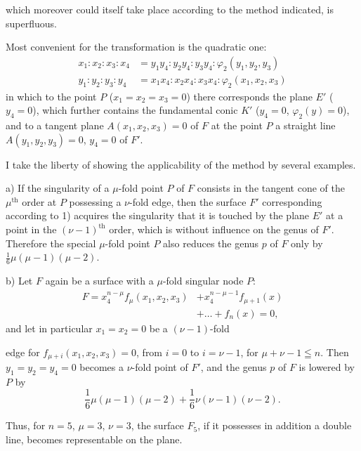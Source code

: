 \documentclass{article}
\begin{document}
which moreover could itself take place according to the method indicated, is superfluous.

Most convenient for the transformation is the quadratic one:
\[
\begin{aligned}
x_1 : x_2 : x_3 : x_4 &= y_1 y_4 : y_2 y_4 : y_3 y_4 : \varphi_2(y_1, y_2, y_3) \\
y_1 : y_2 : y_3 : y_4 &= x_1 x_4 : x_2 x_4 : x_3 x_4 : \varphi_2(x_1, x_2, x_3)
\end{aligned}
\tag{1}
\]
in which to the point $P$ ($x_1 = x_2 = x_3 = 0$) there corresponds the plane $E'$ ($y_4 = 0$), which further contains the fundamental conic $K'$ ($y_4 = 0$, $\varphi_2(y) = 0$), and to a tangent plane $A(x_1, x_2, x_3) = 0$ of $F$ at the point $P$ a straight line $A(y_1, y_2, y_3) = 0$, $y_4 = 0$ of $F'$.

I take the liberty of showing the applicability of the method by several examples.

a) If the singularity of a $\mu$-fold point $P$ of $F$ consists in the tangent cone of the $\mu^{\text{th}}$ order at $P$ possessing a $\nu$-fold edge, then the surface $F'$ corresponding according to 1) acquires the singularity that it is touched by the plane $E'$ at a point in the $(\nu-1)^{\text{th}}$ order, which is without influence on the genus of $F'$. Therefore the special $\mu$-fold point $P$ also reduces the genus $p$ of $F$ only by $\frac{1}{6}\mu(\mu-1)(\mu-2)$.

b) Let $F$ again be a surface with a $\mu$-fold singular node $P$:
\[
\begin{aligned}
F = x_4^{n-\mu} f_\mu(x_1, x_2, x_3) &+ x_4^{n-\mu-1} f_{\mu+1}(x) \\
&+ \ldots + f_n(x) = 0,
\end{aligned}
\tag{2}
\]
and let in particular $x_1 = x_2 = 0$ be a $(\nu-1)$-fold

edge for $f_{\mu+i}(x_1, x_2, x_3) = 0$, from $i = 0$ to $i = \nu - 1$, for $\mu + \nu - 1 \leqq n$. Then $y_1 = y_2 = y_4 = 0$ becomes a $\nu$-fold point of $F'$, and the genus $p$ of $F$ is lowered by $P$ by
\[ \frac{1}{6}\mu(\mu-1)(\mu-2) + \frac{1}{6}\nu(\nu-1)(\nu-2). \]

Thus, for $n = 5$, $\mu = 3$, $\nu = 3$, the surface $F_5$, if it possesses in addition a double line, becomes representable on the plane.
\end{document}
